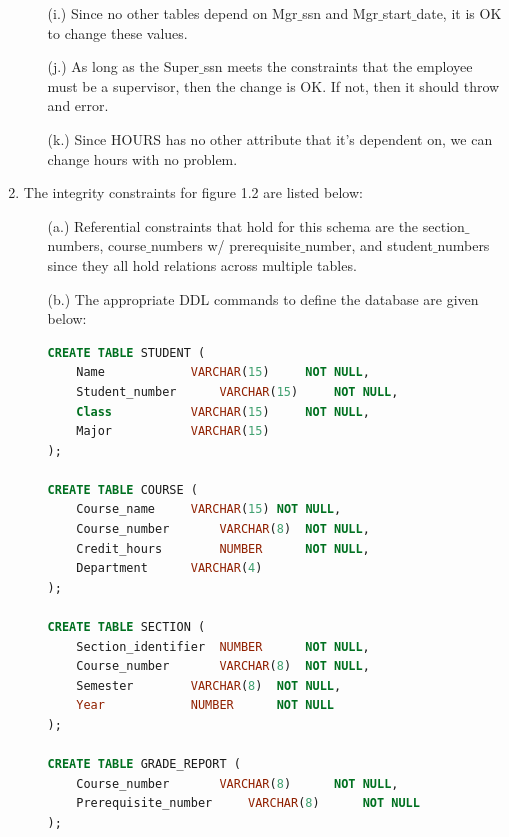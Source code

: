\documentclass[12pt]{article}
\begin{document}
\begin{enumerate}
\begin{itemize}
		\item[(i.)] Since no other tables depend on Mgr$\_$ssn and Mgr$\_$start$\_$date, it is OK to change these values.
		\item[(j.)] As long as the Super$\_$ssn meets the constraints that the employee must be a supervisor, then the change is OK. If not, then it should throw and error.
		\item[(k.)] Since HOURS has no other attribute that it's dependent on, we can change hours with no problem.
	\end{itemize}
	\pagebreak
	\item The integrity constraints for figure 1.2 are listed below:
	\begin{itemize}
		\item[(a.)] Referential constraints that hold for this schema are the section$\_$numbers, course$\_$numbers w/ prerequisite$\_$number, and student$\_$numbers since they all hold relations across multiple tables.
		\item[(b.)] The appropriate DDL commands to define the database are given below: 
\begin{center}
\begin{lstlisting}[language=sql]
CREATE TABLE STUDENT (
	Name			VARCHAR(15) 	NOT NULL, 
	Student_number 		VARCHAR(15) 	NOT NULL, 
	Class			VARCHAR(15) 	NOT NULL,
	Major			VARCHAR(15)
); 			
			
CREATE TABLE COURSE (
	Course_name		VARCHAR(15)	NOT NULL,
	Course_number 		VARCHAR(8) 	NOT NULL,
	Credit_hours		NUMBER 		NOT NULL,
	Department		VARCHAR(4)
); 
			
CREATE TABLE SECTION (
	Section_identifier 	NUMBER		NOT NULL,
	Course_number 		VARCHAR(8) 	NOT NULL,
	Semester		VARCHAR(8) 	NOT NULL,
	Year			NUMBER		NOT NULL
); 
			
CREATE TABLE GRADE_REPORT (
	Course_number		VARCHAR(8)  	NOT NULL,
	Prerequisite_number 	VARCHAR(8)  	NOT NULL
);
\end{lstlisting}
\end{center}
		
	\end{itemize}
\end{enumerate}
\end{document}
